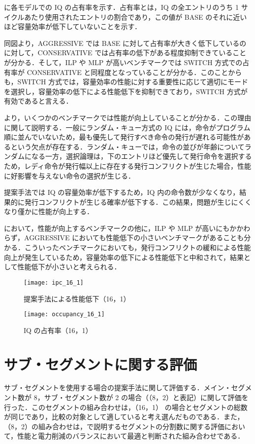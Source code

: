に各モデルでの IQ の占有率を示す．占有率とは，IQ の全エントリのうち 1 サイクルあたり使用されたエントリの割合であり，この値が BASE のそれに近いほど容量効率が低下していないことを示す．

同図より，AGGRESSIVE では BASE に対して占有率が大きく低下しているのに対して，CONSERVATIVE では占有率の低下がある程度抑制できていることが分かる．そして，ILP や MLP が高いベンチマークでは SWITCH 方式での占有率が CONSERVATIVE と同程度となっていることが分かる．このことからも，SWITCH 方式では，容量効率の性能に対する重要性に応じて適切にモードを選択し，容量効率の低下による性能低下を抑制できており，SWITCH 方式が有効であると言える．

より，いくつかのベンチマークでは性能が向上していることが分かる．この理由に関して説明する．一般にランダム・キュー方式の IQ には，命令がプログラム順に並んでいないため，最も優先して発行すべき命令の発行が遅れる可能性があるという欠点が存在する．ランダム・キューでは，命令の並びが年齢についてランダムになる一方，選択論理は，下のエントリほど優先して発行命令を選択するため，レディ命令が発行幅以上に存在する発行コンフリクトが生じた場合，性能に好影響を与えない命令の選択が生じる．

提案手法では IQ の容量効率が低下するため，IQ 内の命令数が少なくなり，結果的に発行コンフリクトが生じる確率が低下する．この結果，問題が生じにくくなり僅かに性能が向上する．

において，性能が向上するベンチマークの他に，ILP や MLP が高いにもかかわらず，AGGRESSIVE においても性能低下の小さいベンチマークがあることも分かる．こういったベンチマークにおいても，発行コンフリクトの緩和による性能向上が発生しているため，容量効率の低下による性能低下と中和されて，結果として性能低下が小さいと考えられる．

\begin{figure}[htb]
  \centering
  \texttt{[image: ipc\_16\_1]}
  \caption{提案手法による性能低下（16，1）}
  \label{fig:ipc_16_1}
\end{figure}

\begin{figure}[htb]
  \centering
  \texttt{[image: occupancy\_16\_1]}
  \caption{IQ の占有率（16，1）}
  \label{fig:occupancy_16_1}
\end{figure}

\clearpage

\section{サブ・セグメントに関する評価}
\label{sec:eval_subseg}
サブ・セグメントを使用する場合の提案手法に関して評価する．メイン・セグメント数が 8，サブ・セグメント数が 2 の場合（（8，2）と表記）に関して評価を行った．このセグメントの組み合わせは，（16，1） の場合とセグメントの総数が同じであり，比較の対象として適していると考え選んだものである．また，（8，2）の組み合わせは，で説明するセグメントの分割数に関する評価において，性能と電力削減のバランスにおいて最適と判断された組み合わせである．

